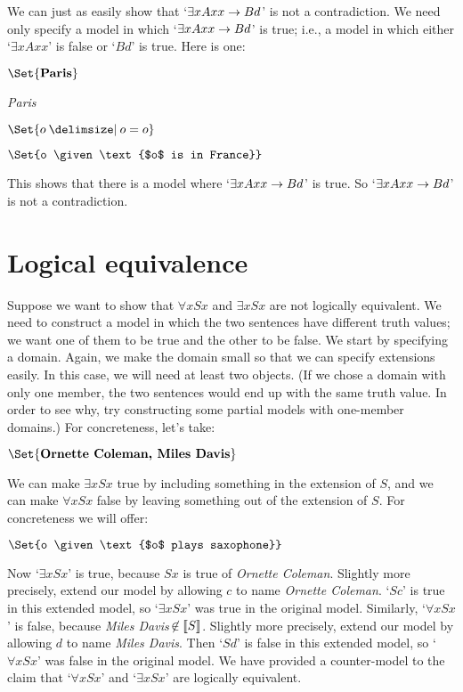 We can just as easily show that `$\exists xAxx \rightarrow Bd$' is not a contradiction. We need only specify a model in which `$\exists xAxx \rightarrow Bd$' is true; i.e., a model in which either `$\exists x Axx$' is false or `$Bd$' is true. Here is one:
	\begin{interp}
		\item[\domain] $\Set{\emph{Paris}}$
		\item[\denote{d}] \emph{Paris}
		\item[\denote{A}] $\Set{o \given o=o}$
		\item[\denote{B}] $\Set{o \given \text{$o$ is in France}}$
	\end{interp}
This shows that there is a model where `$\exists xAxx \rightarrow Bd$' is true. So `$\exists x Axx \rightarrow Bd$' is not a contradiction.

\section{Logical equivalence}
Suppose we want to show that $\forall x Sx$ and $\exists x Sx$ are not logically equivalent. We need to construct a model in which the two sentences have different truth values; we want one of them to be true and the other to be false. We start by specifying a domain. Again, we make the domain small so that we can specify extensions easily. In this case, we will need at least two objects. (If we chose a domain with only one member, the two sentences would end up with the same truth value. In order to see why, try constructing some partial models with one-member domains.) For concreteness, let's take:
	\begin{interp}
		\item[\domain] $\Set{\text{\emph{Ornette Coleman, Miles Davis}}}$
	\end{interp}
We can make $\exists x Sx$ true by including something in the extension of $S$, and we can make $\forall x Sx$ false by leaving something out of the extension of $S$. For concreteness we will offer:
	\begin{interp}
		\item[\denote{S}] $\Set{o \given \text{$o$ plays saxophone}}$
	\end{interp}
Now `$\exists x Sx$' is true, because $Sx$ is true of \emph{Ornette Coleman}. Slightly more precisely, extend our model by allowing $c$ to name \emph{Ornette Coleman}.  `$Sc$' is true in this extended model, so `$\exists x Sx$' was true in the original model. Similarly, `$\forall x Sx$' is false, because \emph{Miles Davis}$\,\not\in\llbracket S\rrbracket$. Slightly more precisely, extend our model by allowing $d$ to name \emph{Miles Davis}. Then `$Sd$' is false in this extended model, so `$\forall x Sx$' was false in the original model. We have provided a counter-model to the claim that `$\forall x Sx$' and `$\exists x Sx$' are logically equivalent.
